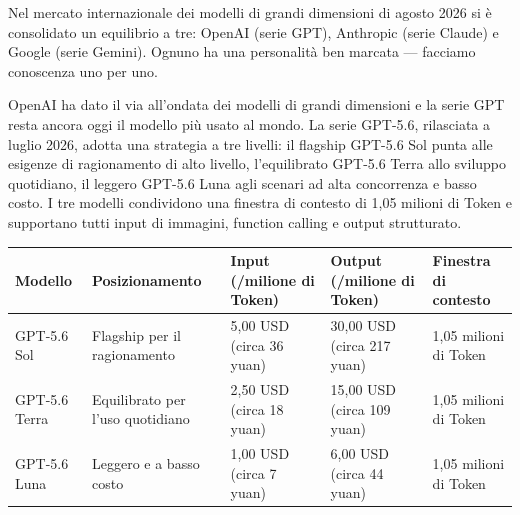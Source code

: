 


Nel mercato internazionale dei modelli di grandi dimensioni di agosto 2026 si è consolidato un equilibrio a tre: OpenAI (serie GPT), Anthropic (serie Claude) e Google (serie Gemini). Ognuno ha una personalità ben marcata — facciamo conoscenza uno per uno.


OpenAI ha dato il via all'ondata dei modelli di grandi dimensioni e la serie GPT resta ancora oggi il modello più usato al mondo. La serie GPT-5.6, rilasciata a luglio 2026, adotta una strategia a tre livelli: il flagship GPT-5.6 Sol punta alle esigenze di ragionamento di alto livello, l'equilibrato GPT-5.6 Terra allo sviluppo quotidiano, il leggero GPT-5.6 Luna agli scenari ad alta concorrenza e basso costo. I tre modelli condividono una finestra di contesto di 1,05 milioni di Token e supportano tutti input di immagini, function calling e output strutturato.

\begin{center}
\begin{tabularx}{\linewidth}{|X|X|X|X|X|}
\hline
\textbf{Modello} & \textbf{Posizionamento} & \textbf{Input (/milione di Token)} & \textbf{Output (/milione di Token)} & \textbf{Finestra di contesto} \tabularnewline
\hline
GPT-5.6 Sol & Flagship per il ragionamento & 5,00 USD (circa 36 yuan) & 30,00 USD (circa 217 yuan) & 1,05 milioni di Token \tabularnewline
GPT-5.6 Terra & Equilibrato per l'uso quotidiano & 2,50 USD (circa 18 yuan) & 15,00 USD (circa 109 yuan) & 1,05 milioni di Token \tabularnewline
GPT-5.6 Luna & Leggero e a basso costo & 1,00 USD (circa 7 yuan) & 6,00 USD (circa 44 yuan) & 1,05 milioni di Token \tabularnewline
\hline
\end{tabularx}
\end{center}

